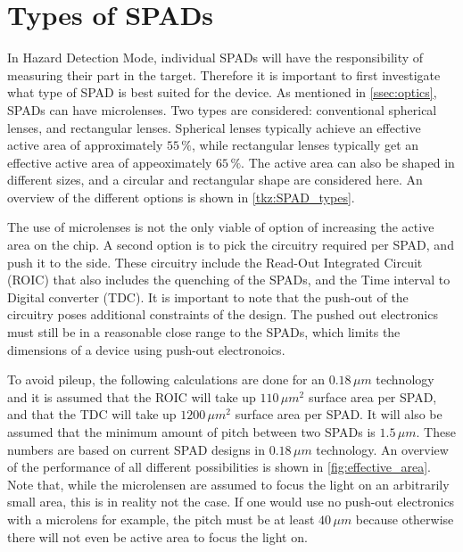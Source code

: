 \section{Types of SPADs}\label{ssec:SPADs}
In Hazard Detection Mode, individual SPADs will have the responsibility of measuring their part in the target. Therefore it is important to first investigate what type of SPAD is best suited for the device. As mentioned in \cref{ssec:optics}, SPADs can have microlenses. Two types are considered: conventional spherical lenses, and rectangular lenses. Spherical lenses typically achieve an effective active area of approximately $55\,\%$, while rectangular lenses typically get an effective active area of appeoximately $65\,\%$. The active area can also be shaped in different sizes, and a circular and rectangular shape are considered here. An overview of the different options is shown in \cref{tkz:SPAD_types}.




The use of microlenses is not the only viable of option of increasing the active area on the chip. A second option is to pick the circuitry required per SPAD, and push it to the side. These circuitry include the Read-Out Integrated Circuit (ROIC) that also includes the quenching of the SPADs, and the Time interval to Digital converter (TDC). It is important to note that the push-out of the circuitry poses additional constraints of the design. The pushed out electronics must still be in a reasonable close range to the SPADs, which limits the dimensions of a device using push-out electronoics.

To avoid pileup, the following calculations are done for an $0.18\,\mu m$ technology and it is assumed that the ROIC will take up $110\,\mu m^2$ surface area per SPAD, and that the TDC will take up $1200\,\mu m^2$ surface area per SPAD. It will also be assumed that the minimum amount of pitch between two SPADs is $1.5\,\mu m$. These numbers are based on current SPAD designs in $0.18\,\mu m$ technology. An overview of the performance of all different possibilities is shown in \cref{fig:effective_area}. Note that, while the microlensen are assumed to focus the light on an arbitrarily small area, this is in reality not the case. If one would use no push-out electronics with a microlens for example, the pitch must be at least $40\,\mu m$ because otherwise there will not even be active area to focus the light on.

